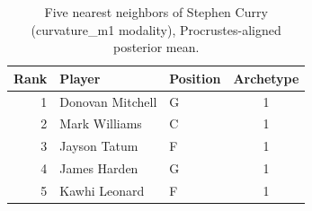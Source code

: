 \begin{table}[htbp]
  \centering\small
  \begin{tabular}{rllc}
    \toprule
    Rank & Player & Position & Archetype \\
    \midrule
    1 & Donovan Mitchell & G & 1 \\
    2 & Mark Williams & C & 1 \\
    3 & Jayson Tatum & F & 1 \\
    4 & James Harden & G & 1 \\
    5 & Kawhi Leonard & F & 1 \\
    \bottomrule
  \end{tabular}
  \caption{Five nearest neighbors of Stephen Curry (curvature_m1 modality), Procrustes-aligned posterior mean.}
  \label{tab:Stephen_Curry_neighbors_curvature_m1}
\end{table}

